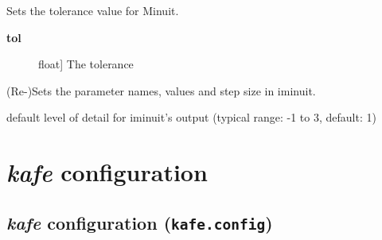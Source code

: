 \documentclass[a4paper,10pt,english]{sphinxmanual}
\begin{document}
\begin{fulllineitems}
\begin{fulllineitems}
\begin{description}
\end{description}

\end{fulllineitems}


\begin{fulllineitems}
\label{module_doc:kafe.iminuit_wrapper.IMinuit.set_tolerance}
Sets the tolerance value for Minuit.
\begin{description}
\item[{\textbf{tol}}] \leavevmode{[}float{]}
The tolerance

\end{description}

\end{fulllineitems}


\begin{fulllineitems}
\label{module_doc:kafe.iminuit_wrapper.IMinuit.update_parameter_data}
(Re-)Sets the parameter names, values and step size in iminuit.

\end{fulllineitems}


\end{fulllineitems}


\begin{fulllineitems}
\label{module_doc:kafe.iminuit_wrapper.P_DETAIL_LEVEL}
default level of detail for iminuit's output
(typical range: -1 to 3, default: 1)

\end{fulllineitems}



\section{\emph{kafe} configuration}
\label{module_doc:kafe-configuration}

\subsection{\emph{kafe} configuration (\texttt{kafe.config})}
\label{module_doc:kafe-configuration-kafe-config}\label{module_doc:module-kafe.config}\label{module_doc:module-config}
\end{document}
